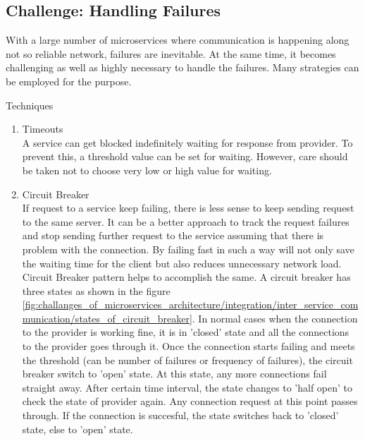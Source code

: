 \subsection{Challenge: Handling Failures}\label{section:challanges_of_microservices_architecture/handling_failures}
With a large number of microservices where communication is happening along not so reliable network, failures are inevitable. At the same time, it becomes challenging as well as highly necessary to handle the failures. Many strategies can be employed for the purpose. \cite{Newman:2015aa}\cite{Richardson:2015ab}\cite{Nygard:2007aa}
\begin{shaded}Techniques\end{shaded}
\begin{enumerate}
\item Timeouts \\ A service can get blocked indefinitely waiting for response from provider. To prevent this, a threshold value can be set for waiting. However, care should be taken not to choose very low or high value for waiting. 
\item Circuit Breaker \\ If request to a service keep failing, there is less sense to keep sending request to the same server. It can be a better approach to track the request failures and stop sending further request to the service assuming that there is problem with the connection. By failing fast in such a way will not only save the waiting time for the client but also reduces unnecessary network load. Circuit Breaker pattern helps to accomplish the same. A circuit breaker has three states as shown in the figure \ref{fig:challanges_of_microservices_architecture/integration/inter_service_communication/states_of_circuit_breaker}. In normal cases when the connection to the provider is working fine, it is in 'closed' state and all the connections to the provider goes through it. Once the connection starts failing and meets the threshold (can be number of failures or frequency of failures), the circuit breaker switch to 'open' state. At this state, any more connections fail straight away. After certain time interval, the state changes to 'half open' to check the state of provider again. Any connection request at this point passes through. If the connection is succesful, the state switches back to 'closed' state, else to 'open' state.\cite{Fowler:2014ac} \cite{Newman:2015aa} \cite{Nygard:2007aa}
\begin{figure}[H]
\begin{center}

\end{center}
\end{figure}
\end{enumerate}
